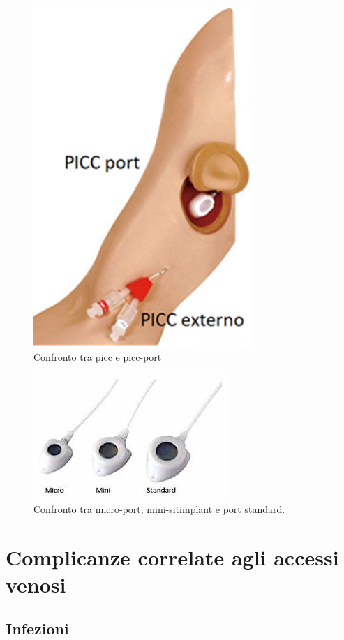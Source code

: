 \begin{figure}[H]
    \begin{center}
    \includegraphics[width=0.3\columnwidth]{img/PartesPICC.png}
    \end{center}
    \caption[Confronto tra picc e picc-port]{Confronto tra picc e picc-port
    \cite{img49}}

\end{figure}

\begin{figure}[H]
    \begin{center}
    \includegraphics[width=0.4\columnwidth]{img/portconfronto.jpeg}
    \end{center}
    \caption[Confronto tra micro-port, mini-sitimplant e port standard.]{Confronto tra micro-port, mini-sitimplant e port standard.
    \cite{img50}}

\end{figure}

\section{Complicanze correlate agli accessi venosi}

\subsection{Infezioni}


